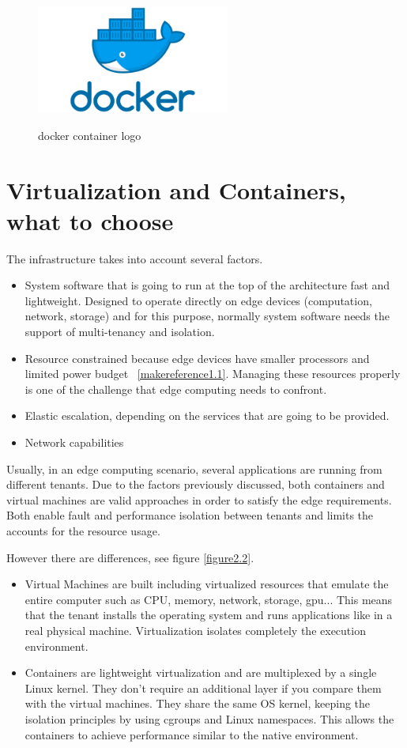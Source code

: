 \begin{figure}[h!]%
    \centering
    \includegraphics[width=2.5in]{figures/docker.png}
~\caption{docker container logo}
\label{figure2.1}
\end{figure}

\section{Virtualization and Containers, what to choose}
\label{makereference2.2}

The infrastructure takes into account several factors.

\begin{itemize}
    \item System software that is going to run at the top of the architecture fast and lightweight. Designed to operate directly on edge devices (computation, network, storage) and for this purpose, normally system software needs the support of multi-tenancy and isolation.
    \item Resource constrained because edge devices have smaller processors and limited power budget ~\ref{makereference1.1}. Managing these resources properly is one of the challenge that edge computing needs to confront.
    \item Elastic escalation, depending on the services that are going to be provided.
    \item Network capabilities
\end{itemize}
Usually, in an edge computing scenario, several applications are running from different tenants. Due to the factors previously discussed, both containers and virtual machines are valid approaches in order to satisfy the edge requirements.~\cite{CORR:chong:2018} Both enable fault and performance isolation between tenants and limits the accounts for the resource usage.
\newpage

However there are differences, see figure \ref{figure2.2}.

\begin{itemize}
  \item Virtual Machines are built including virtualized resources that emulate the entire computer such as  CPU, memory, network, storage, gpu... This means that the tenant installs the operating system and runs applications like in a real physical machine. Virtualization isolates completely the execution environment.
  \item Containers are lightweight virtualization and are multiplexed by a single Linux kernel. They don't require an additional layer if you compare them with the virtual machines. They share the same OS kernel, keeping the isolation principles by using cgroups and Linux namespaces. This allows the containers to achieve performance similar to the native environment.
\end{itemize}

